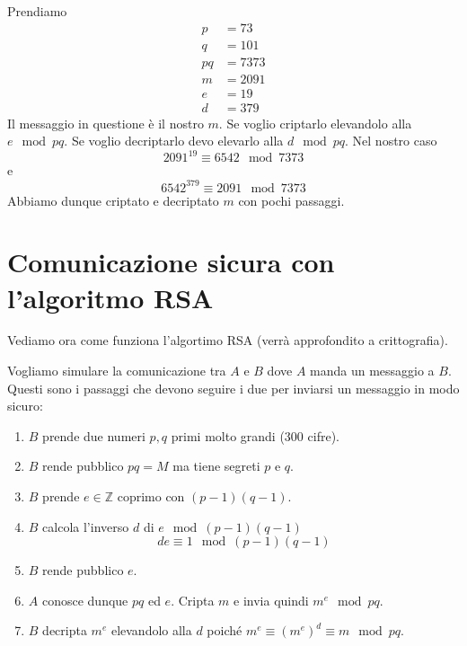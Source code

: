 \begin{example}
	Prendiamo
	\begin{equation*}
		\begin{array}{ll}
			p  & = 73   \\
			q  & = 101  \\
			pq & = 7373 \\
			m  & = 2091 \\
			e  & = 19   \\
			d  & = 379
		\end{array}
	\end{equation*}
	Il messaggio in questione \`e il nostro $m$. Se voglio criptarlo
	elevandolo alla $e \mod{pq}$. Se voglio decriptarlo devo elevarlo alla $d \mod{pq}$.
	Nel nostro caso
	\begin{equation*}
		2091^{19} \equiv 6542 \mod{7373}
	\end{equation*}
	e
	\begin{equation*}
		6542^{379} \equiv 2091 \mod{7373}
	\end{equation*}
	Abbiamo dunque criptato e decriptato $m$ con pochi passaggi.
\end{example}

\section{Comunicazione sicura con l'algoritmo RSA}
Vediamo ora come funziona l'algortimo RSA (verr\`a approfondito a crittografia).

Vogliamo simulare la comunicazione tra $A$ e $B$ dove $A$ manda un messaggio a $B$.
Questi sono i passaggi che devono seguire i due per inviarsi un messaggio in modo sicuro:
\begin{enumerate}
	\item $B$ prende due numeri $p, q$ primi molto grandi (300 cifre).
	\item $B$ rende pubblico $pq = M$ ma tiene segreti $p$ e $q$.
	\item $B$ prende $e \in \mathbb{Z}$ coprimo con $(p - 1)(q - 1)$.
	\item $B$ calcola l'inverso $d$ di $e \mod{(p - 1)(q - 1)}$
	      \begin{equation*}
		      de \equiv 1 \mod{(p - 1)(q - 1)}
	      \end{equation*}
	\item $B$ rende pubblico $e$.
	\item $A$ conosce dunque $pq$ ed $e$. Cripta $m$ e invia quindi $m^e \mod{pq}$.
	\item $B$ decripta $m^e$ elevandolo alla $d$ poich\'e $m^e \equiv (m^e)^d \equiv m \mod{pq}$.
\end{enumerate}